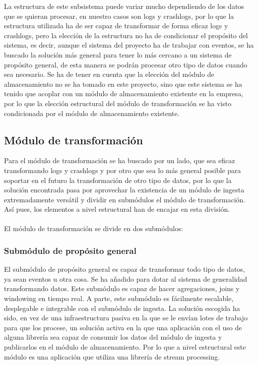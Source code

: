 La estructura de este subsistema puede variar mucho dependiendo de los datos que se quieran procesar, en nuestro casos son logs y crashlogs, por lo que la estructura utilizada ha de ser capaz de transformar de forma eficaz logs y crashlogs, pero la elección de la estructura no ha de condicionar el propósito del sistema, es decir, aunque el sistema del proyecto ha de trabajar con eventos, se ha buscado la solución más general para tener lo más cercano a un sistema de propósito general, de esta manera se podrán procesar otro tipo de datos cuando sea necesario. Se ha de tener en cuenta que la elección del módulo de almacenamiento no se ha tomado en este proyecto, sino que este sistema se ha tenido que acoplar con un módulo de almacenamiento existente en la empresa, por lo que la elección estructural del módulo de transformación se ha visto condicionada por el módulo de almacenamiento existente.


\subsection{Módulo de transformación}

Para el módulo de transformación se ha buscado por un lado, que sea eficaz transformando logs y crashlogs y por otro que sea lo más general posible para soportar en el futuro la transformación de otro tipo de datos, por lo que la solución encontrada pasa por aprovechar la existencia de un módulo de ingesta extremadamente versátil y dividir en submódulos el módulo de transformación. Así pues, los elementos a nivel estructural han de encajar en esta división.
\\\\
El módulo de transformación se divide en dos submódulos:

\subsubsection{Submódulo de propósito general}

El submódulo de propósito general es capaz de transformar todo tipo de datos, ya sean eventos u otra cosa. Se ha añadido para dotar al sistema de generalidad transformando datos. Este submódulo es capaz de hacer agregaciones, joins y windowing en tiempo real. A parte, este submódulo es fácilmente escalable, desplegable e integrable con el submódulo de ingesta. La solución escogida ha sido, en vez de una infraestructura pasiva en la que se le envían lotes de trabajo para que los procese, un solución activa en la que una aplicación con el uso de alguna librería sea capaz de consumir los datos del módulo de ingesta y publicarlos en el módulo de almacenamiento. Por lo que a nivel estructural este módulo es una aplicación que utiliza una librería de stream processing.

